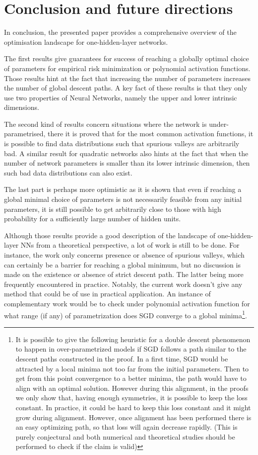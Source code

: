 \documentclass[11pt]{article} %
\begin{document}
\section{Conclusion and future directions}
In conclusion, the presented paper provides a comprehensive overview of the optimisation landscape for one-hidden-layer networks.
\par
The first results give guarantees for success of reaching a globally optimal choice of parameters for empirical risk minimization or polynomial activation functions. Those results hint at the fact that increasing the number of parameters increases the number of global descent paths. A key fact of these results is that they only use two properties of Neural Networks, namely the upper and lower intrinsic dimensions.
\par
The second kind of results concern situations where the network is under-parametrised, there it is proved that for the most common activation functions, it is possible to find data distributions such that spurious valleys are arbitrarily bad. A similar result for quadratic networks also hints at the fact that when the number of network parameters is smaller than its lower intrinsic dimension, then such bad data distributions can also exist.
\par
The last part is perhaps more optimistic as it is shown that even if reaching a global minimal choice of parameters is not necessarily feasible from any initial parameters, it is still possible to get arbitrarily close to those with high probability for a sufficiently large number of hidden units.
\par 
Although those results provide a good description of the landscape of one-hidden-layer NNs from a theoretical perspective, a lot of work is still to be done. For instance, the work only concerns presence or absence of spurious valleys, which can certainly be a barrier for reaching a global minimum, but no discussion is made on the existence or absence of strict descent path. The latter being more frequently encountered in practice. Notably, the current work doesn't give any method that could be of use in practical application. An instance of complementary work would be to check under polynomial activation function for what range (if any) of parametrization does SGD converge to a global minima\footnote{It is possible to give the following heuristic for a double descent phenomenon to happen in over-parametrized models if SGD follows a path similar to the descent paths constructed in the proof. In a first time, SGD would be attracted by a local minima not too far from the initial parameters. Then to get from this point convergence to a better minima, the path would have to align with an optimal solution. However during this alignment, in the proofs we only show that, having enough symmetries, it is possible to keep the loss constant. In practice, it could be hard to keep this loss constant and it might grow during alignment. However, once alignment has been performed there is an easy optimizing path, so that loss will again decrease rapidly. (This is purely conjectural and both numerical and theoretical studies should be performed to check if the claim is valid)}. 
\end{document}
